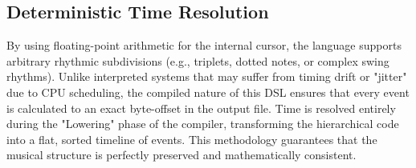 \subsection{Deterministic Time Resolution}

By using floating-point arithmetic for the internal cursor, the language supports arbitrary rhythmic
subdivisions (e.g., triplets, dotted notes, or complex swing rhythms).
Unlike interpreted systems that may suffer from timing drift or "jitter" due to CPU scheduling, the compiled
nature of this DSL ensures that every event is calculated to an exact byte-offset in the output file.
Time is resolved entirely during the "Lowering" phase of the compiler, transforming the hierarchical code
into a flat, sorted timeline of events.
This methodology guarantees that the musical structure is perfectly preserved and mathematically consistent.
